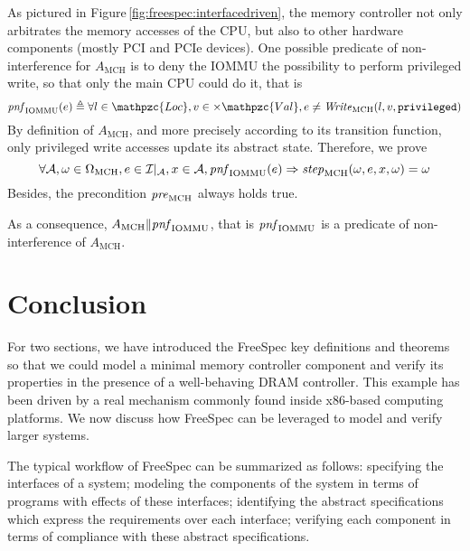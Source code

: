 \begin{example}
  As pictured in Figure\,\ref{fig:freespec:interfacedriven}, the memory
  controller not only arbitrates the memory accesses of the CPU, but also to
  other hardware components (mostly PCI and PCIe devices).
  One possible predicate of non-interference for $A_{\mathrm{MCH}}$ is to deny
  the IOMMU the possibility to perform privileged write, so that only the main
  CPU could do it, that is
  \[
    \func{pnf}_{\mathrm{IOMMU}}(e) \triangleq \forall l \in \mathpzc{Loc}, v \in
    \times \mathpzc{Val}, e \neq \func{Write}_{\mathrm{MCH}}(l, v,
    \texttt{privileged})
  \]
  By definition of \( A_{\mathrm{MCH}} \), and more precisely according to its
  transition function, only privileged write accesses update its abstract state.
  Therefore, we prove
  \[
    \forall \mathcal{A}, \omega \in \Omega_{\mathrm{MCH}}, e \in
    \mathcal{I}|_{\mathrm{\mathcal{A}}}, x \in \mathcal{A},
    \mathit{pnf}_{\mathrm{IOMMU}}(e) \Rightarrow
    \mathit{step}_{\mathrm{MCH}}(\omega, e, x, \omega) = \omega
  \]
  Besides, the precondition \( \mathit{pre}_{\mathrm{MCH}} \) always holds true.

  As a consequence, \( A_{\mathrm{MCH}} \| \mathit{pnf}_{\mathrm{IOMMU}} \), that
  is \( \mathit{pnf}_{\mathrm{IOMMU}} \) is a predicate of non-interference of \(
  A_{\mathrm{MCH}} \).
\end{example}

\section{Conclusion}
\label{sec:freespec:scale}

For two sections, we have introduced the FreeSpec key definitions and theorems
so that we could model a minimal memory controller component and verify its
properties in the presence of a well-behaving DRAM controller.
%
This example has been driven by a real mechanism commonly found inside x86-based
computing platforms.
%
We now discuss how FreeSpec can be leveraged to model and verify larger systems.

The typical workflow of FreeSpec can be summarized as follows: specifying the
interfaces of a system; modeling the components of the system in terms of
programs with effects of these interfaces; identifying the abstract
specifications which express the requirements over each interface; verifying
each component in terms of compliance with these abstract specifications.

